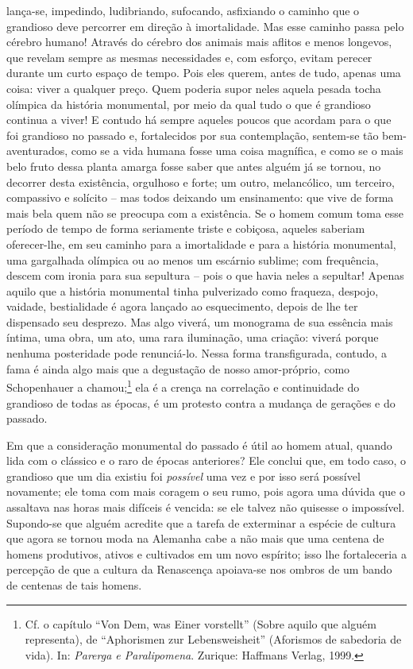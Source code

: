 lança-se, impedindo, ludibriando, sufocando, asfixiando o caminho que o
grandioso deve percorrer em direção à imortalidade. Mas esse caminho
passa pelo cérebro humano! Através do cérebro dos animais mais aflitos e
menos longevos, que revelam sempre as mesmas necessidades e, com
esforço, evitam perecer durante um curto espaço de tempo. Pois eles
querem, antes de tudo, apenas uma coisa: viver a qualquer preço. Quem
poderia supor neles aquela pesada tocha olímpica da história monumental,
por meio da qual tudo o que é grandioso continua a viver! E contudo há
sempre aqueles poucos que acordam para o que foi grandioso no passado e,
fortalecidos por sua contemplação, sentem-se tão bem-aventurados, como
se a vida humana fosse uma coisa magnífica, e como se o mais belo fruto
dessa planta amarga fosse saber que antes alguém já se tornou, no
decorrer desta existência, orgulhoso e forte; um outro, melancólico, um
terceiro, compassivo e solícito -- mas todos deixando um ensinamento:
que vive de forma mais bela quem não se preocupa com a existência. Se o
homem comum toma esse período de tempo de forma seriamente triste e
cobiçosa, aqueles saberiam oferecer-lhe, em seu caminho para a
imortalidade e para a história monumental, uma gargalhada olímpica ou ao
menos um escárnio sublime; com frequência, descem com ironia para sua
sepultura -- pois o que havia neles a sepultar! Apenas aquilo que a
história monumental tinha pulverizado como fraqueza, despojo, vaidade,
bestialidade é agora lançado ao esquecimento, depois de lhe ter
dispensado seu desprezo. Mas algo viverá, um monograma de sua essência
mais íntima, uma obra, um ato, uma rara iluminação, uma criação: viverá
porque nenhuma posteridade pode renunciá-lo. Nessa forma transfigurada,
contudo, a fama é ainda algo mais que a degustação de nosso
amor-próprio, como Schopenhauer a chamou;\footnote{Cf. o capítulo ``Von
  Dem, was Einer vorstellt'' (Sobre aquilo que alguém representa), de
  ``Aphorismen zur Lebensweisheit'' (Aforismos de sabedoria de vida).
  In: \emph{Parerga e Paralipomena}. Zurique: Haffmans Verlag, 1999.} ela é a crença na correlação e
continuidade do grandioso de todas as épocas, é um protesto contra a
mudança de gerações e do passado.

Em que a consideração monumental do passado é útil ao homem atual,
quando lida com o clássico e o raro de épocas anteriores? Ele conclui
que, em todo caso, o grandioso que um dia existiu foi \emph{possível}
uma vez e por isso será possível novamente; ele toma com mais coragem o
seu rumo, pois agora uma dúvida que o assaltava nas horas mais difíceis
é vencida: se ele talvez não quisesse o impossível. Supondo-se que
alguém acredite que a tarefa de exterminar a espécie de cultura que
agora se tornou moda na Alemanha cabe a não mais que uma centena de
homens produtivos, ativos e cultivados em um novo espírito; isso lhe
fortaleceria a percepção de que a cultura da Renascença apoiava-se nos
ombros de um bando de centenas de tais homens.

